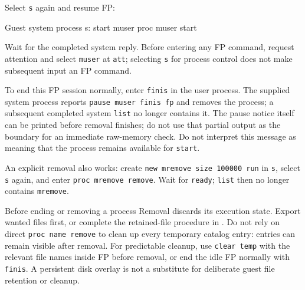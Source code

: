 Select \passthrough{\lstinline!s!} again and resume FP:

\begin{commandexample}{Guest system process s: start muser}
proc muser start
\end{commandexample}

Wait for the completed system reply. Before entering any FP command,
request attention and select \passthrough{\lstinline!muser!} at
\passthrough{\lstinline!att!}; selecting \passthrough{\lstinline!s!}
for process control does not make subsequent input an FP command.

To end this FP session normally, enter \passthrough{\lstinline!finis!} in the user process. The supplied system process reports \passthrough{\lstinline!pause muser finis fp!} and removes the process; a subsequent completed system \passthrough{\lstinline!list!} no longer contains it. The pause notice itself can be printed before removal finishes; do not use that partial output as the boundary for an immediate raw-memory check. Do not interpret this message as meaning that the process remains available for \passthrough{\lstinline!start!}.

An explicit removal also works: create \passthrough{\lstinline!new mremove size 100000 run!} in \passthrough{\lstinline!s!}, select \passthrough{\lstinline!s!} again, and enter \passthrough{\lstinline!proc mremove remove!}. Wait for \passthrough{\lstinline!ready!}; \passthrough{\lstinline!list!} then no longer contains \passthrough{\lstinline!mremove!}.

\begin{operationnote}{Before ending or removing a process}
Removal discards its execution state. Export wanted files first, or complete
the retained-file procedure in
.
Do not rely on direct \texttt{proc name remove} to clean up every temporary
catalog entry: entries can remain visible after removal. For predictable
cleanup, use \texttt{clear temp} with the relevant file names inside FP before
removal, or end the idle FP normally with \texttt{finis}. A persistent disk
overlay is not a substitute for deliberate guest file retention or cleanup.
\end{operationnote}

